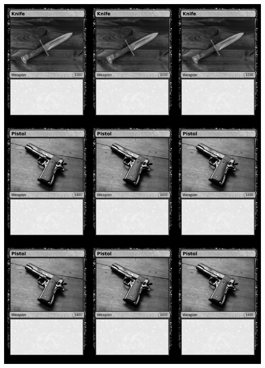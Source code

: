 \documentclass[a4paper]{article}
\begin{document}
\begin{center}
	\centering
	\includegraphics[width=190.5mm,height=266.7mm]{output/temp/page6.png}
\end{center}

\newpage
\end{document}
